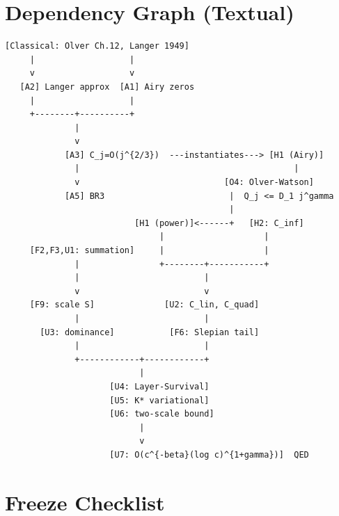 \documentclass[12pt,a4paper]{amsart}
\theoremstyle{definition}
\begin{document}
\section{Dependency Graph (Textual)}
\label{sec:textual_dag}

\begin{verbatim}
[Classical: Olver Ch.12, Langer 1949]
     |                   |
     v                   v
   [A2] Langer approx  [A1] Airy zeros
     |                   |
     +--------+----------+
              |
              v
            [A3] C_j=O(j^{2/3})  ---instantiates---> [H1 (Airy)]
              |                                           |
              v                             [O4: Olver-Watson]
            [A5] BR3                         |  Q_j <= D_1 j^gamma
                                             |
                          [H1 (power)]<------+   [H2: C_inf]
                               |                    |
     [F2,F3,U1: summation]     |                    |
              |                +--------+-----------+
              |                         |
              v                         v
     [F9: scale S]              [U2: C_lin, C_quad]
              |                         |
       [U3: dominance]           [F6: Slepian tail]
              |                         |
              +------------+------------+
                           |
                     [U4: Layer-Survival]
                     [U5: K* variational]
                     [U6: two-scale bound]
                           |
                           v
                     [U7: O(c^{-beta}(log c)^{1+gamma})]  QED
\end{verbatim}

\section{Freeze Checklist}
\label{sec:freeze}
\end{document}
